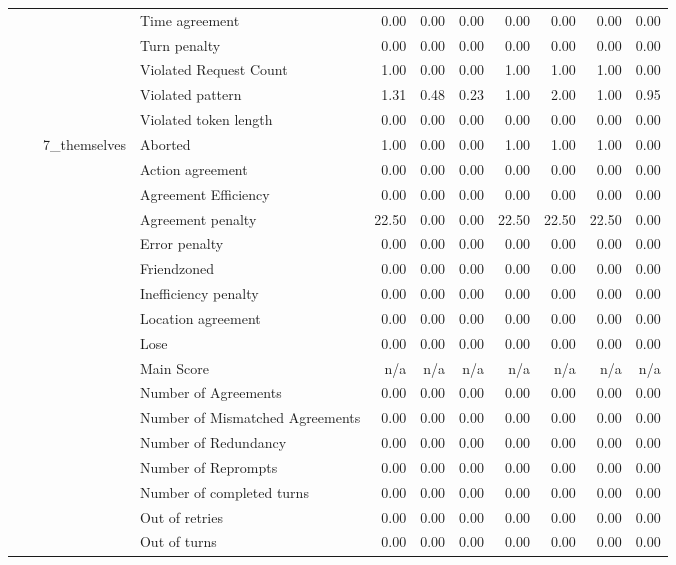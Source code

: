 \begin{tabular}{llllrrrrrrr}
 &  &  & Time agreement & 0.00 & 0.00 & 0.00 & 0.00 & 0.00 & 0.00 & 0.00 \\
 &  &  & Turn penalty & 0.00 & 0.00 & 0.00 & 0.00 & 0.00 & 0.00 & 0.00 \\
 &  &  & Violated Request Count & 1.00 & 0.00 & 0.00 & 1.00 & 1.00 & 1.00 & 0.00 \\
 &  &  & Violated pattern & 1.31 & 0.48 & 0.23 & 1.00 & 2.00 & 1.00 & 0.95 \\
 &  &  & Violated token length & 0.00 & 0.00 & 0.00 & 0.00 & 0.00 & 0.00 & 0.00 \\
\cline{3-11}
 &  & \multirow[t]{27}{*}{7_themselves} & Aborted & 1.00 & 0.00 & 0.00 & 1.00 & 1.00 & 1.00 & 0.00 \\
 &  &  & Action agreement & 0.00 & 0.00 & 0.00 & 0.00 & 0.00 & 0.00 & 0.00 \\
 &  &  & Agreement Efficiency & 0.00 & 0.00 & 0.00 & 0.00 & 0.00 & 0.00 & 0.00 \\
 &  &  & Agreement penalty & 22.50 & 0.00 & 0.00 & 22.50 & 22.50 & 22.50 & 0.00 \\
 &  &  & Error penalty & 0.00 & 0.00 & 0.00 & 0.00 & 0.00 & 0.00 & 0.00 \\
 &  &  & Friendzoned & 0.00 & 0.00 & 0.00 & 0.00 & 0.00 & 0.00 & 0.00 \\
 &  &  & Inefficiency penalty & 0.00 & 0.00 & 0.00 & 0.00 & 0.00 & 0.00 & 0.00 \\
 &  &  & Location agreement & 0.00 & 0.00 & 0.00 & 0.00 & 0.00 & 0.00 & 0.00 \\
 &  &  & Lose & 0.00 & 0.00 & 0.00 & 0.00 & 0.00 & 0.00 & 0.00 \\
 &  &  & Main Score & n/a & n/a & n/a & n/a & n/a & n/a & n/a \\
 &  &  & Number of Agreements & 0.00 & 0.00 & 0.00 & 0.00 & 0.00 & 0.00 & 0.00 \\
 &  &  & Number of Mismatched Agreements & 0.00 & 0.00 & 0.00 & 0.00 & 0.00 & 0.00 & 0.00 \\
 &  &  & Number of Redundancy & 0.00 & 0.00 & 0.00 & 0.00 & 0.00 & 0.00 & 0.00 \\
 &  &  & Number of Reprompts & 0.00 & 0.00 & 0.00 & 0.00 & 0.00 & 0.00 & 0.00 \\
 &  &  & Number of completed turns & 0.00 & 0.00 & 0.00 & 0.00 & 0.00 & 0.00 & 0.00 \\
 &  &  & Out of retries & 0.00 & 0.00 & 0.00 & 0.00 & 0.00 & 0.00 & 0.00 \\
 &  &  & Out of turns & 0.00 & 0.00 & 0.00 & 0.00 & 0.00 & 0.00 & 0.00 \\

\end{tabular}
